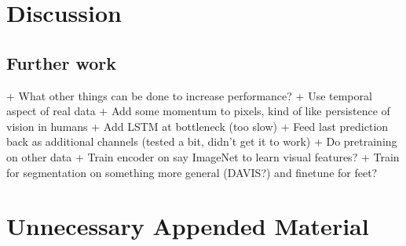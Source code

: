 \documentclass{kththesis}
\begin{document}
\chapter{Discussion}

\section{Further work}
+ What other things can be done to increase performance?
  + Use temporal aspect of real data
    + Add some momentum to pixels, kind of like persistence of vision in humans 
    + Add LSTM at bottleneck (too slow)
    + Feed last prediction back as additional channels (tested a bit, didn't get it to work)
  + Do pretraining on other data
    + Train encoder on say ImageNet to learn visual features?
    + Train for segmentation on something more general (DAVIS?) and finetune for feet?

\printbibliography[heading=bibintoc] %

\appendix

\chapter{Unnecessary Appended Material}
\end{document}
